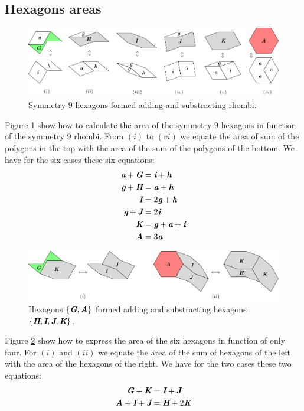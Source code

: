 \documentclass[11pt]{article}
\def\mathbi#1{\textbf{\em #1}}
\begin{document}
\subsection{Hexagons areas}

\begin{figure}[H]
\centering
\includegraphics[scale=1]{hexagons-from-rhombi-9}
\caption{Symmetry $9$ hexagons formed adding and substracting rhombi.}
\label{fig:hexagons-from-rhombi-9}
\end{figure}

Figure \ref{fig:hexagons-from-rhombi-9} show how to calculate the area of the symmetry $9$ hexagons in function of the symmetry $9$ rhombi. From $(i)$ to $(vi)$ we equate the area of sum of the polygons in the top with the area of the sum of the polygons of the bottom. We have for the six cases these six equations:
\begin{align}
\mathbi{a} + \mathbi{G} &= \mathbi{i} + \mathbi{h} \\
\mathbi{g} + \mathbi{H} &= \mathbi{a} + \mathbi{h} \\
\mathbi{I} &= 2\mathbi{g} + \mathbi{h} \\
\mathbi{g} + \mathbi{J} &= 2\mathbi{i} \\
\mathbi{K} &= \mathbi{g} + \mathbi{a} + \mathbi{i} \\
\mathbi{A} &= 3\mathbi{a}
\end{align}

\begin{figure}[H]
\centering
\includegraphics[scale=1]{hexagons-from-hexagons-9}
\caption{Hexagons $\{\mathbi{G},\mathbi{A}\}$ formed adding and substracting hexagons $\{\mathbi{H},\mathbi{I},\mathbi{J},\mathbi{K}\}$.}
\label{fig:hexagons-from-hexagons-9}
\end{figure}

Figure \ref{fig:hexagons-from-hexagons-9} show how to express the area of the six hexagons in function of only four. For $(i)$ and $(ii)$ we equate the area of the sum of hexagons of the left with the area of the hexagons of the right. We have for the two cases these two equations:
\begin{align}
\mathbi{G} + \mathbi{K} &= \mathbi{I} + \mathbi{J} \\
\mathbi{A} + \mathbi{I} + \mathbi{J} &= \mathbi{H} + 2\mathbi{K}
\end{align}
\end{document}
